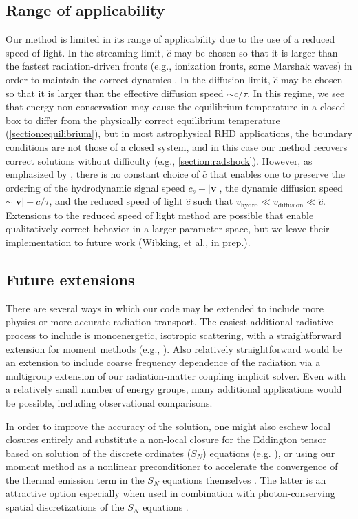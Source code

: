 \documentclass[fleqn,usenatbib]{mnras}
\newcommand{\vc}[1]{{\mathbf{#1}}}
\begin{document}
\subsection{Range of applicability}
Our method is limited in its range of applicability due to the use of a reduced speed of light. In the streaming limit, $\hat c$ may be chosen so that it is larger than the fastest radiation-driven fronts (e.g., ionization fronts, some Marshak waves) in order to maintain the correct dynamics \citep{Gnedin_2001}. In the diffusion limit, $\hat c$ may be chosen so that it is larger than the effective diffusion speed $\sim c / \tau$. In this regime, we see that energy non-conservation may cause the equilibrium temperature in a closed box to differ from the physically correct equilibrium temperature (\autoref{section:equilibrium}), but in most astrophysical RHD applications, the boundary conditions are not those of a closed system, and in this case our method recovers correct solutions without difficulty (e.g., \autoref{section:radshock}). However, as emphasized by \cite{Skinner_2013}, there is no constant choice of $\hat c$ that enables one to preserve the ordering of the hydrodynamic signal speed $c_s + |\vc{v}|$, the dynamic diffusion speed $\sim |\vc{v}| + c / \tau$, and the reduced speed of light $\hat c$ such that $v_{\text{hydro}} \ll v_{\text{diffusion}} \ll \hat c$. Extensions to the reduced speed of light method are possible that enable qualitatively correct behavior in a larger parameter space, but we leave their implementation to future work (Wibking, et al., in prep.).

\subsection{Future extensions}
There are several ways in which our code may be extended to include more physics or more accurate radiation transport. The easiest additional radiative process to include is monoenergetic, isotropic scattering, with a straightforward extension for moment methods (e.g., \citealt{Jiang12a}). Also relatively straightforward would be an extension to include coarse frequency dependence of the radiation via a multigroup extension of our radiation-matter coupling implicit solver. Even with a relatively small number of energy groups, many additional applications would be possible, including observational comparisons.

In order to improve the accuracy of the solution, one might also eschew local closures entirely and substitute a non-local closure for the Eddington tensor based on solution of the discrete ordinates ($S_N$) equations (e.g. \citealt{Davis_2012,Jiang12a}), or using our moment method as a nonlinear preconditioner to accelerate the convergence of the thermal emission term in the $S_N$ equations themselves \citep{Park_2012}. The latter is an attractive option especially when used in combination with photon-conserving spatial discretizations of the $S_N$ equations \citep{Adams97a,Adams_2001}.
\end{document}

